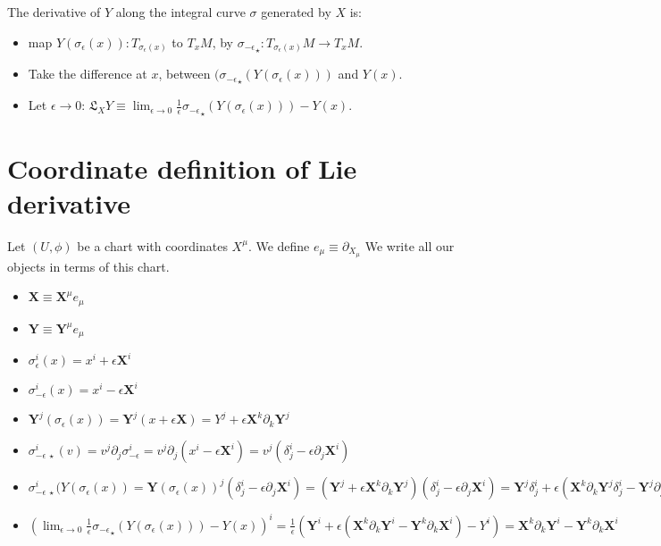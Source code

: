 \documentclass[11pt]{book}
\newcommand{\Lie}{\ensuremath{\mathfrak{L}}}
\newcommand{\pushforward}[1]{\ensuremath{{#1}_{\star}}}
\newcommand{\pushfwd}[1]{\pushforward{#1}}
\newcommand{\pf}[1]{\pushfwd{#1}}
\begin{document}
The derivative of $Y$ along the integral curve $\sigma$ generated by $X$ is:
\begin{itemize}
    \item map $Y(\sigma_\epsilon(x)): T_{\sigma_\epsilon(x)}$ to $T_x M$,
    by $\pf{\sigma_{-\epsilon}}: T_{\sigma_{\epsilon}(x)}M \rightarrow T_x M$.
    \item Take the difference at $x$, between $(\pf{\sigma_{-\epsilon}}(Y(\sigma_\epsilon(x)))$ and $Y(x)$.
    \item Let $\epsilon \to 0$: 
        $\Lie_X Y \equiv \lim_{\epsilon \to 0} \frac{1}{\epsilon} \pushforward{\sigma_{-\epsilon}}(Y(\sigma_\epsilon(x))) - Y(x)$.
\end{itemize}

\section{Coordinate definition of Lie derivative}

Let $(U, \phi)$ be a chart with coordinates $X^\mu$. We define $e_\mu \equiv \partial_{X_\mu}$ We write
all our objects in terms of this chart.

\begin{itemize}
\item $\mathbf{X} \equiv \mathbf{X}^\mu e_\mu$
\item $\mathbf{Y} \equiv \mathbf{Y}^\mu e_\mu$
\item $\sigma_{\epsilon}^i(x) = x^i + \epsilon \mathbf{X}^i$
\item $\sigma_{-\epsilon}^i(x) = x^i - \epsilon \mathbf{X}^i$
\item $\mathbf Y^j(\sigma_\epsilon(x)) = 
    \mathbf Y^j(x + \epsilon \mathbf X) = 
    Y^j + \epsilon \mathbf X^k \partial_k \mathbf Y^j$
\item $\sigma_{-\epsilon~\star}^i(v) =
        v^j \partial_j \sigma_{-\epsilon}^i = 
        v^j \partial_j (x^i - \epsilon \mathbf X^i) =
        v^j (\delta^i_j - \epsilon \partial_j\mathbf X^i)$
\item $\sigma_{-\epsilon~\star}^i(Y(\sigma_\epsilon(x)) = 
    \mathbf Y(\sigma_{\epsilon}(x))^j (\delta^i_j - \epsilon \partial_j\mathbf X^i) =
    (\mathbf Y^j + \epsilon \mathbf X^k \partial_k \mathbf Y^j) (\delta^i_j - \epsilon \partial_j\mathbf X^i)
    = \mathbf Y^j \delta_j^i + \epsilon(\mathbf X^k \partial_k \mathbf Y^j \delta_j^i 
    - \mathbf Y^j \partial_j \mathbf X^i) + \epsilon^2(\dots)
    = \mathbf Y^i + \epsilon(\mathbf X^k \partial_k \mathbf Y^i - \mathbf Y^k \partial_k \mathbf X^i)
    $

\item $(\lim_{\epsilon \to 0} \frac{1}{\epsilon} \pushforward{\sigma_{-\epsilon}}(Y(\sigma_\epsilon(x))) - Y(x))^i =
    \frac{1}{\epsilon}(\mathbf Y^i + \epsilon(\mathbf X^k \partial_k \mathbf Y^i - \mathbf Y^k \partial_k \mathbf X^i) - Y^i)
            = \mathbf X^k \partial_k \mathbf Y^i - \mathbf Y^k \partial_k \mathbf X^i$
\end{itemize}
\end{document}
